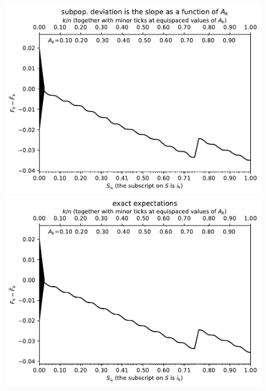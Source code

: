 \documentclass{article}
\begin{document}
\begin{figure}
\begin{centering}

\parbox{\imsize}{\includegraphics[width=\imsize]
                {./codes/weighted/50000_2500_10_3/cumulative.pdf}}
\quad\quad
\parbox{\imsize}{\includegraphics[width=\imsize]
                {./codes/weighted/50000_2500_10_3/cumulative_exact.pdf}}

\vspace{\vertsep}


\end{centering}
\end{figure}
\end{document}
